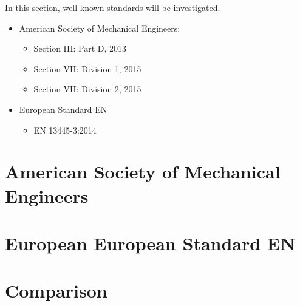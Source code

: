 
In this section, well known standards will be investigated.

\begin{itemize}
    \item American Society of Mechanical Engineers:
	    \begin{itemize}
	       	\item Section III: Part D, 2013
	    	\item Section VII: Division 1, 2015
	    	\item Section VII: Division 2, 2015
	    \end{itemize}
    \item European Standard EN
        \begin{itemize}
	       	\item EN 13445-3:2014
	    \end{itemize}
\end{itemize}

\section{American Society of Mechanical Engineers}

\section{European European Standard EN}

\section{Comparison}

